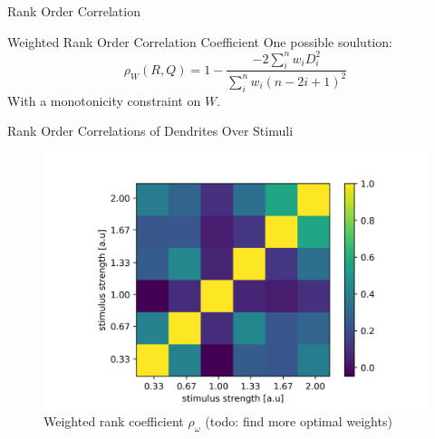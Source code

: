 \documentclass[10pt]{beamer}
\begin{document}
\begin{frame}[fragile]{Rank Order Correlation}


\end{frame}

\begin{frame}{Weighted Rank Order Correlation Coefficient}
One possible soulution:
$$
\rho_W(R,Q) = 1-\frac{-2\sum_i^nw_iD_i^2}{\sum_i^nw_i(n-2i+1)^2}
$$
With a monotonicity constraint on $W$.
\end{frame}

\begin{frame}[fragile]{Rank Order Correlations of Dendrites Over Stimuli}
\begin{center}
	\begin{figure}\caption*{Weighted rank coefficient $\rho_{\omega}$ (todo: find more optimal weights)}
      \includegraphics[width=1.0\textwidth]{rank_presence.png}
	\end{figure}
	\end{center}
\end{frame}
\end{document}
